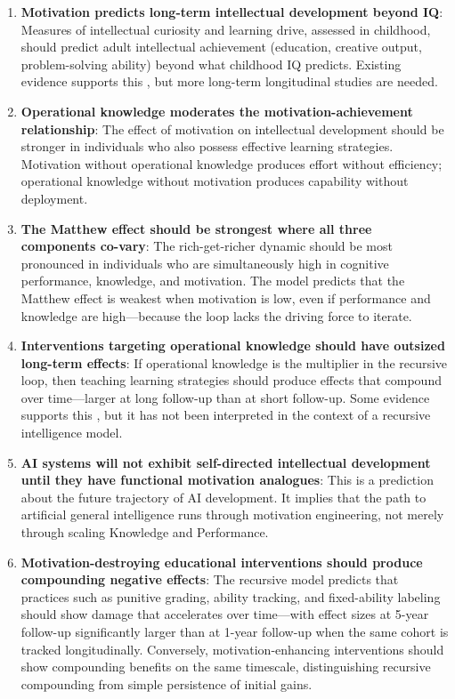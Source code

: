 \documentclass[12pt,a4paper]{article}
\begin{document}
\begin{enumerate}
\item \textbf{Motivation predicts long-term intellectual development beyond IQ}: Measures of intellectual curiosity and learning drive, assessed in childhood, should predict adult intellectual achievement (education, creative output, problem-solving ability) beyond what childhood IQ predicts. Existing evidence supports this \citep{vonStumm2011,Murayama2013}, but more long-term longitudinal studies are needed.

\item \textbf{Operational knowledge moderates the motivation-achievement relationship}: The effect of motivation on intellectual development should be stronger in individuals who also possess effective learning strategies. Motivation without operational knowledge produces effort without efficiency; operational knowledge without motivation produces capability without deployment.

\item \textbf{The Matthew effect should be strongest where all three components co-vary}: The rich-get-richer dynamic should be most pronounced in individuals who are simultaneously high in cognitive performance, knowledge, and motivation. The model predicts that the Matthew effect is weakest when motivation is low, even if performance and knowledge are high---\hspace{0pt}because the loop lacks the driving force to iterate.

\item \textbf{Interventions targeting operational knowledge should have outsized long-term effects}: If operational knowledge is the multiplier in the recursive loop, then teaching learning strategies should produce effects that compound over time---\hspace{0pt}larger at long follow-up than at short follow-up. Some evidence supports this \citep{DignathButtner2008}, but it has not been interpreted in the context of a recursive intelligence model.

\item \textbf{AI systems will not exhibit self-directed intellectual development until they have functional motivation analogues}: This is a prediction about the future trajectory of AI development. It implies that the path to artificial general intelligence runs through motivation engineering, not merely through scaling Knowledge and Performance.

\item \textbf{Motivation-destroying educational interventions should produce compounding negative effects}: The recursive model predicts that practices such as punitive grading, ability tracking, and fixed-ability labeling should show damage that accelerates over time---\hspace{0pt}with effect sizes at 5-year follow-up significantly larger than at 1-year follow-up when the same cohort is tracked longitudinally. Conversely, motivation-enhancing interventions should show compounding benefits on the same timescale, distinguishing recursive compounding from simple persistence of initial gains.
\end{enumerate}
\end{document}
